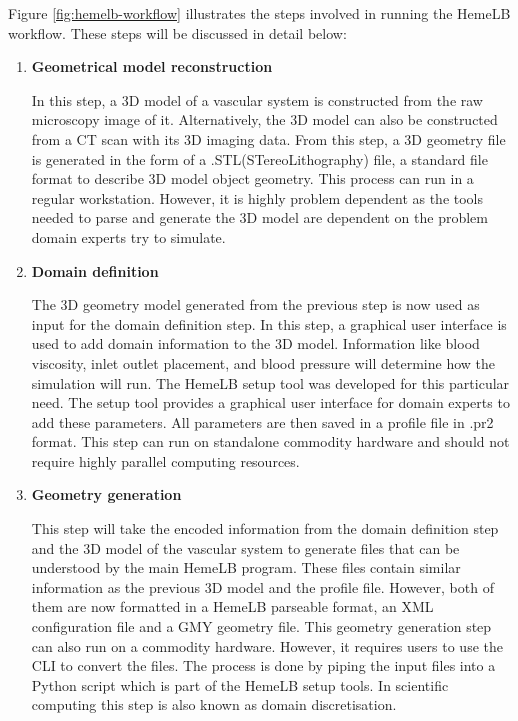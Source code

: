 \vspace{1cm}


Figure \ref{fig:hemelb-workflow} illustrates the steps involved in running the HemeLB workflow. These steps will be discussed in detail below:

\begin{enumerate}

\item{\textbf{Geometrical model reconstruction}}

In this step, a 3D model of a vascular system is constructed from the raw microscopy image of it. Alternatively, the 3D model can also be constructed from a CT scan with its 3D imaging data. From this step, a 3D geometry file is generated in the form of a .STL(STereoLithography) file,  a standard file format to describe 3D model object geometry. This  process can run in a regular workstation. However, it is highly problem dependent as the tools needed to parse and generate the 3D model are dependent on the problem domain experts try to simulate.

\item{\textbf{Domain definition}}

The 3D geometry model generated from the previous step is now used as input for the domain definition step. In this step, a graphical user interface is used to add domain information to the 3D model. Information like blood viscosity, inlet outlet placement, and blood pressure will determine how the simulation will run. The HemeLB setup tool was developed for this particular need. The setup tool provides a graphical user interface for domain experts to add these parameters. All parameters are then saved in a profile file in .pr2 format. This step can run on standalone commodity hardware and should not require highly parallel computing resources.

\item{\textbf{Geometry generation}}

This step will take the encoded information from the domain definition step and the 3D model of the vascular system to generate files that can be understood by the main HemeLB program. These files contain similar information as the previous 3D model and the profile file. However, both of them are now formatted in a HemeLB parseable format, an XML configuration file and a GMY geometry file. This geometry generation step can also run on a commodity hardware. However, it requires users to use the CLI to convert the files. The process is done by piping the input files into a Python script which is part of the HemeLB setup tools. In scientific computing this step is also known as domain discretisation.


\end{enumerate}

